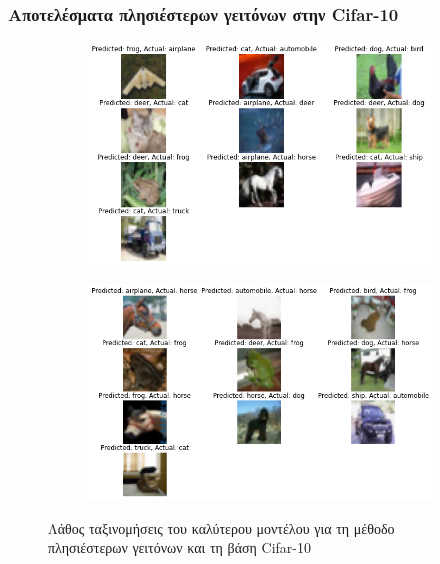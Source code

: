 \documentclass{beamer}
\begin{document}
\begin{frame}
\frametitle{Αποτελέσματα πλησιέστερων γειτόνων στην Cifar-10}

\begin{figure}[H]
    \centering

    \begin{subfigure}[t]{0.48\linewidth}
    \includegraphics[width=\linewidth]{cifar/wrong_results_knn_1.png}
    \end{subfigure}
    \begin{subfigure}[t]{0.48\linewidth}
    \includegraphics[width=\linewidth]{cifar/wrong_results_knn_2.png}
    \end{subfigure}

    \caption{Λάθος ταξινομήσεις του καλύτερου μοντέλου για τη μέθοδο
    πλησιέστερων γειτόνων και τη βάση Cifar-10}
    \label{fig:cifar_wrong_knn}
\end{figure}

\end{frame}
\end{document}
